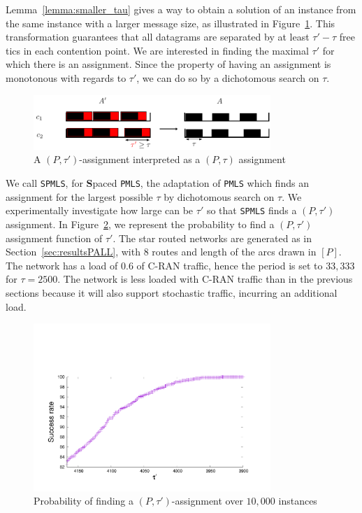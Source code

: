 \documentclass[a4paper,10pt]{journal}
\newcommand\PMLS{\texttt{PMLS}\xspace}
\newcommand\SPMLS{\texttt{SPMLS}\xspace}
\begin{document}
     Lemma~\ref{lemma:smaller_tau} gives a way to obtain a solution of an instance from the same instance with a larger message size, as illustrated in Figure~\ref{fig:space}. 
     This transformation guarantees that all datagrams are separated by at least $\tau' - \tau$ free tics in each contention point. We are interested in finding the maximal $\tau'$
    for which there is an assignment. Since the property of having an assignment is monotonous with regards to $\tau'$, we can do so by a dichotomous search on $\tau$.

           \begin{figure}
       \begin{center}
      \includegraphics[width = 0.8\textwidth]{space.pdf}
      \end{center} 
      \caption{A $(P,\tau')$-assignment interpreted as a $(P,\tau)$ assignment}
      \label{fig:space}   
     \end{figure}   


    We call \SPMLS, for \textbf{S}paced \PMLS, the adaptation of \PMLS which finds an assignment for the largest possible $\tau$ by dichotomous search on $\tau$. We experimentally investigate how large can be $\tau'$ so that \SPMLS finds a $(P,\tau')$ assignment. In Figure~\ref{fig:spacetau}, we represent the probability to find a $(P,\tau')$ assignment function of $\tau'$. The star routed networks are generated as in Section~\ref{sec:resultsPALL}, with $8$ routes and length of the arcs drawn in $[P]$. The network has a load of $0.6$ of C-RAN traffic, hence the period is set to $33,333$ for $\tau = 2500$. The network is less loaded with C-RAN traffic than in the previous sections because it will also support stochastic traffic, incurring an additional load.

    \begin{figure}
       \begin{center}
      \includegraphics[width = 0.8\textwidth]{distribtau.pdf}
      \end{center}
      \caption{Probability of finding a $(P,\tau')$-assignment over $10,000$ instances}
      \label{fig:spacetau}   
     \end{figure}   
\end{document}
